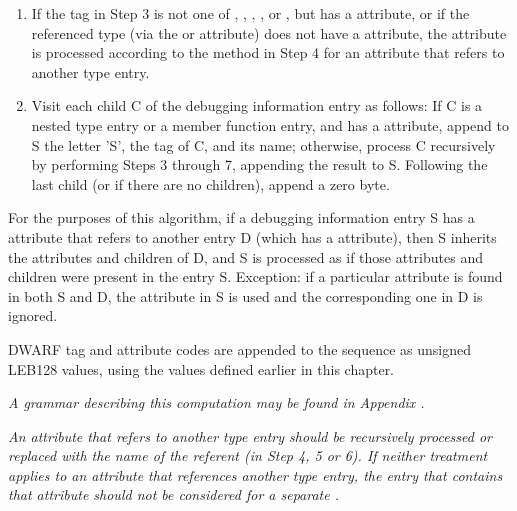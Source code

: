 \begin{enumerate}[1. ]
\item If the tag in Step 3 is not one of ,
, 
,
, or 
, but has
a  attribute, or if the referenced type (via
the  or 
 attribute) does not have a
 attribute, the attribute is processed according to
the method in Step 4 for an attribute that refers to another
type entry.


\item Visit each child C of the debugging information
entry as follows: If C is a nested type entry or a member
function entry, and has 
a  attribute, append to
S the letter 'S', the tag of C, and its name; otherwise,
process C recursively by performing Steps 3 through 7,
appending the result to S. Following the last child (or if
there are no children), append a zero byte.
\end{enumerate}



For the purposes of this algorithm, if a debugging information
entry S has a 
attribute that refers to
another entry D (which has a 
attribute),
then S inherits the attributes and children of D, and S is
processed as if those attributes and children were present in
the entry S. Exception: if a particular attribute is found in
both S and D, the attribute in S is used and the corresponding
one in D is ignored.

DWARF tag and attribute codes are appended to the sequence
as unsigned LEB128 values, using the values defined earlier
in this chapter.

\textit{A grammar describing this computation may be found in
Appendix .
}

\textit{An attribute that refers to another type entry should
be recursively processed or replaced with the name of the
referent (in Step 4, 5 or 6). If neither treatment applies to
an attribute that references another type entry, the entry
that contains that attribute should not be considered for a
separate .}

